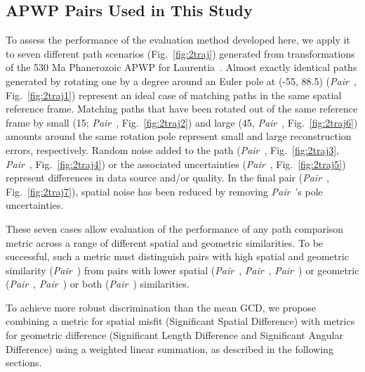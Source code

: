 \subsection{APWP Pairs Used in This Study}

To assess the performance of the evaluation method developed here, we apply it
to seven different path scenarios (Fig.~\ref{fig:2traj}) generated from
transformations of the 530 Ma Phanerozoic APWP for
Laurentia~\citep{T12}. Almost exactly identical paths generated by rotating one
by a degree around an Euler pole at (-55\degree, 88.5\degree)
(\emph{Pair}~\textbf{}, Fig.~\ref{fig:2traj1}) represent an
ideal case of matching paths in the same spatial reference frame. Matching paths
that have been rotated out of the same reference frame by small (15\degree;
\emph{Pair}~\textbf{}, Fig.~\ref{fig:2traj2}) and large
(45\degree, \emph{Pair}~\textbf{}, Fig.~\ref{fig:2traj6})
amounts around the same rotation pole represent small and large reconstruction
errors, respectively. Random noise added to the path
(\emph{Pair}~\textbf{}, Fig.~\ref{fig:2traj3},
\emph{Pair}~\textbf{}, Fig.~\ref{fig:2traj4}) or the
associated uncertainties (\emph{Pair}~\textbf{},
Fig.~\ref{fig:2traj5}) represent differences in data source and/or quality. In
the final pair (\emph{Pair}~\textbf{},
Fig.~\ref{fig:2traj7}), spatial noise has been reduced by removing
\emph{Pair}~\textbf{}'s pole uncertainties.

These seven cases allow evaluation of the performance of any path comparison
metric across a range of different spatial and geometric similarities. To be
successful, such a metric must distinguish pairs with high spatial and geometric
similarity (\emph{Pair}~\textbf{}) from pairs with lower
spatial (\emph{Pair}~\textbf{},
\emph{Pair}~\textbf{},
\emph{Pair}~\textbf{})
or geometric (\emph{Pair}~\textbf{},
\emph{Pair}~\textbf{}) or both
(\emph{Pair}~\textbf{}) similarities.

To achieve more robust discrimination than the mean GCD, we propose combining a
metric for spatial misfit (Significant Spatial Difference) with metrics for
geometric difference (Significant Length Difference and Significant Angular
Difference) using a weighted linear summation, as described in the following
sections.

